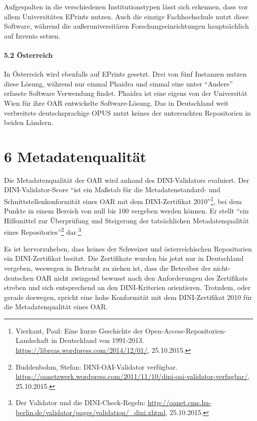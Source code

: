 \documentclass[a4paper,
fontsize=11pt,
oneside,
numbers=noperiodatend,
parskip=half-,
bibliography=totoc,
final
]{scrartcl}
\begin{document}
Aufgespalten in die verschiedenen Institutionstypen lässt sich erkennen,
dass vor allem Universitäten EPrints nutzen. Auch die einzige
Fachhochschule nutzt diese Software, während die außeruniversitären
Forschungseinrichtungen hauptsächlich auf Invenio setzen.

\paragraph{5.2 Österreich}\label{uxf6sterreich-2}

In Österreich wird ebenfalls auf EPrints gesetzt. Drei von fünf
Instanzen nutzen diese Lösung, während nur einmal Phaidra und einmal
eine unter \enquote{Andere} erfasste Software Verwendung findet. Phaidra
ist eine eigens von der Universität Wien für ihre OAR entwickelte
Software-Lösung. Das in Deutschland weit verbreitete deutschsprachige
OPUS nutzt keines der untersuchten Repositorien in beiden Ländern.

\section*{6 Metadatenqualität}\label{metadatenqualituxe4t}

Die Metadatenqualität der OAR wird anhand des DINI-Validators evaluiert.
Der DINI-Validator-Score \enquote{ist ein Maßstab für die
Metadatenstandard- und Schnittstellenkonformität eines OAR mit dem
DINI-Zertifikat 2010}\footnote{Vierkant, Paul: Eine kurze Geschichte der
  Open-Access-Repositorien-Landschaft in Deutschland von 1991-2013.
  \url{https://libreas.wordpress.com/2014/12/01/}, 25.10.2015.}, bei dem
Punkte in einem Bereich von null bis 100 vergeben werden können. Er
stellt \enquote{ein Hilfsmittel zur Überprüfung und Steigerung der
tatsächlichen Metadatenqualität eines Repositories}\footnote{Buddenbohm,
  Stefan: DINI-OAI-Validator verfügbar.
  \url{https://oanetzwerk.wordpress.com/2011/11/10/dini-oai-validator-verfugbar/},
  25.10.2015.} dar.\footnote{Der Validator und die DINI-Check-Regeln:
  \url{http://oanet.cms.hu-berlin.de/validator/pages/validation/_dini.xhtml},
  25.10.2015.}

Es ist hervorzuheben, dass keines der Schweizer und österreichischen
Repositorien ein DINI-Zertifikat besitzt. Die Zertifikate wurden bis
jetzt nur in Deutschland vergeben, weswegen in Betracht zu ziehen ist,
dass die Betreiber der nicht-deutschen OAR nicht zwingend bewusst nach
den Anforderungen des Zertifikats streben und sich entsprechend an den
DINI-Kriterien orientieren. Trotzdem, oder gerade deswegen, spricht eine
hohe Konformität mit dem DINI-Zertifikat 2010 für die Metadatenqualität
eines OAR.
\end{document}
